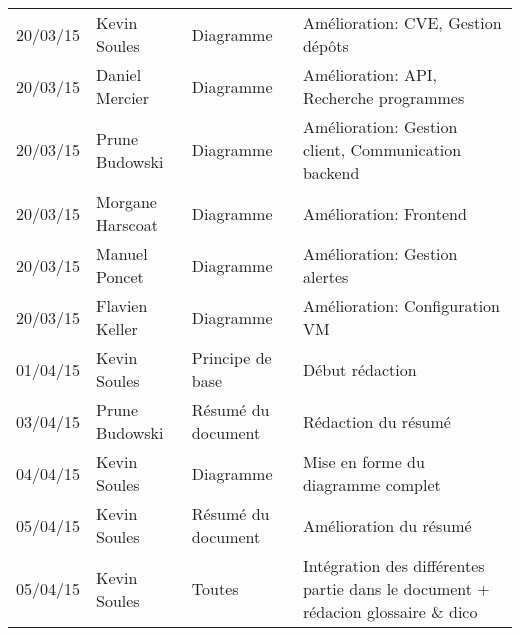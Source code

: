 \small
\begin{tabular}{|p{1.5cm}| >{\raggedright}p{2.9cm}| >{\raggedright}p{3.2cm}|p{7.2cm}|}
  \hline
  \rowcolor{Gainsboro} \color{Navy}{\bfseries Date}  & \color{Navy}{\bfseries Auteur} & \color{Navy}{\bfseries Section(s)}  &\color{Navy}{\bfseries Commentaires} \\
  \hline
  20/03/15 & Kevin Soules & Diagramme  & Amélioration: CVE, Gestion dépôts \\
  \hline
  20/03/15 & Daniel Mercier & Diagramme  & Amélioration: API, Recherche programmes \\
  \hline
  20/03/15 & Prune Budowski & Diagramme  & Amélioration: Gestion client, Communication backend \\
  \hline
  20/03/15 & Morgane Harscoat & Diagramme  & Amélioration: Frontend \\
  \hline
  20/03/15 & Manuel Poncet & Diagramme  & Amélioration: Gestion alertes \\
  \hline
  20/03/15 & Flavien Keller & Diagramme  & Amélioration: Configuration VM \\
  \hline
  01/04/15 & Kevin Soules & Principe de base  & Début rédaction\\
  \hline
  03/04/15 & Prune Budowski & Résumé du document & Rédaction du résumé\\
  \hline
  04/04/15 & Kevin Soules & Diagramme & Mise en forme du diagramme complet\\
  \hline
  05/04/15 & Kevin Soules & Résumé du document & Amélioration du résumé\\
  \hline
  05/04/15 & Kevin Soules & Toutes & Intégration des différentes partie dans le document + rédacion glossaire \& dico\\
  \hline
\end{tabular}
\normalsize
